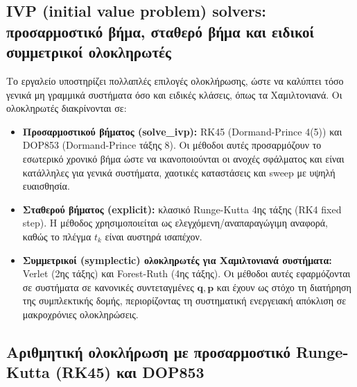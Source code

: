 \documentclass[11pt,a4paper]{report}
\begin{document}
\subsection{IVP (initial value problem) solvers: προσαρμοστικό βήμα, σταθερό βήμα και ειδικοί συμμετρικοί ολοκληρωτές}
\label{subsec:ivp-solvers}

Το εργαλείο υποστηρίζει πολλαπλές επιλογές ολοκλήρωσης, ώστε να καλύπτει
τόσο γενικά μη γραμμικά συστήματα όσο και ειδικές κλάσεις, όπως τα Χαμιλτονιανά.
Οι ολοκληρωτές διακρίνονται σε:

\begin{itemize}
\item \textbf{Προσαρμοστικού βήματος (solve\_ivp):} RK45 (Dormand-Prince 4(5)) και DOP853 (Dormand-Prince τάξης 8).
Οι μέθοδοι αυτές προσαρμόζουν το εσωτερικό χρονικό βήμα ώστε να ικανοποιούνται
οι ανοχές σφάλματος και είναι κατάλληλες για γενικά συστήματα, χαοτικές καταστάσεις και sweep με υψηλή ευαισθησία.
\item \textbf{Σταθερού βήματος (explicit):} κλασικό Runge-Kutta 4ης τάξης (RK4 fixed step).
Η μέθοδος χρησιμοποιείται ως ελεγχόμενη/αναπαραγώγιμη αναφορά, καθώς το πλέγμα $t_k$ είναι αυστηρά ισαπέχον.
\item \textbf{Συμμετρικοί (symplectic) ολοκληρωτές για Χαμιλτονιανά συστήματα:} Verlet (2ης τάξης) και Forest-Ruth (4ης τάξης).
Οι μέθοδοι αυτές εφαρμόζονται σε συστήματα σε κανονικές συντεταγμένες
$\mathbf{q},\mathbf{p}$ και έχουν ως στόχο τη διατήρηση της συμπλεκτικής δομής,
περιορίζοντας τη συστηματική ενεργειακή απόκλιση σε μακροχρόνιες ολοκληρώσεις.
\end{itemize}

\subsection{Αριθμητική ολοκλήρωση με προσαρμοστικό Runge-Kutta (RK45) και DOP853}
\label{subsec:adaptive-rk-solvers}
\end{document}
